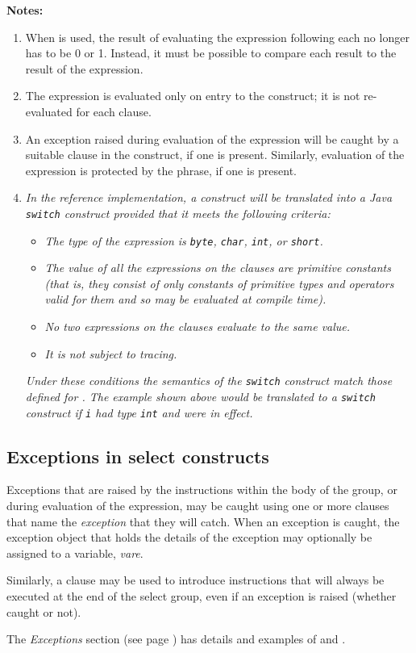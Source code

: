 \textbf{Notes:}
\begin{enumerate}
\item When  is used, the result of evaluating the expression
following each  no longer has to be 0 or 1.  Instead, it
must be possible to compare each result to the result of the
 expression.
\item 
The  expression is evaluated only on entry to the
 construct; it is not re-evaluated for each 
clause.
\item 
An exception raised during evaluation of the  expression
will be caught by a suitable  clause in the construct, if
one is present.
Similarly, evaluation of the  expression is protected by
the  phrase, if one is present.
\item 
\emph{In the reference implementation, a  construct will
be translated into a Java \texttt{switch} construct provided that it
meets the following criteria:}
\begin{itemize}
\item 
\emph{The type of the  expression
is \texttt{byte}, \texttt{char}, \texttt{int}, or \texttt{short}.}
\item 
\emph{The value of all the expressions on the  clauses are
primitive constants (that is, they consist of only constants of
primitive types and operators valid for them and so may be evaluated at
compile time).}
\item 
\emph{No two expressions on the  clauses evaluate to the same
value.}
\item 
\emph{It is not subject to tracing.}
\end{itemize}
\emph{Under these conditions the semantics of the \texttt{switch} construct
match those defined for .  The example shown above would
be translated to a \texttt{switch} construct if \texttt{i} had type \texttt{int}
and  were in effect.}
\end{enumerate}
\subsection{Exceptions in select constructs}
 
Exceptions that are raised by the instructions within the body of the
group, or during evaluation of the  expression, may be
caught using one or more  clauses that name
the \emph{exception} that they will catch.
When an exception is caught, the exception object that holds the details
of the exception may optionally be assigned to a variable,
\emph{vare}.
 
Similarly, a  clause may be used to introduce
instructions that will always be executed at the end of the select
group, even if an exception is raised (whether caught or not).
 
The  \emph{Exceptions} section (see page \pageref{refexcep})  has details and
examples of  and .
\index{,}
